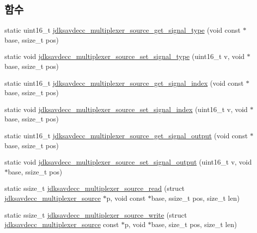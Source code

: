 \subsection*{함수}
\begin{DoxyCompactItemize}
\item 
static uint16\+\_\+t \hyperlink{group__multiplexer__source_ga0707dc4cad979ccf1dbba1a21d3b6348}{jdksavdecc\+\_\+multiplexer\+\_\+source\+\_\+get\+\_\+signal\+\_\+type} (void const $\ast$base, ssize\+\_\+t pos)
\item 
static void \hyperlink{group__multiplexer__source_ga0cbe326f2c6c3e29f647aaf3868d8b0c}{jdksavdecc\+\_\+multiplexer\+\_\+source\+\_\+set\+\_\+signal\+\_\+type} (uint16\+\_\+t v, void $\ast$base, ssize\+\_\+t pos)
\item 
static uint16\+\_\+t \hyperlink{group__multiplexer__source_ga5d365853a896d4d6b9e0c164deb9d268}{jdksavdecc\+\_\+multiplexer\+\_\+source\+\_\+get\+\_\+signal\+\_\+index} (void const $\ast$base, ssize\+\_\+t pos)
\item 
static void \hyperlink{group__multiplexer__source_ga7e54221b3864ffdd04e72ed73ea78c8f}{jdksavdecc\+\_\+multiplexer\+\_\+source\+\_\+set\+\_\+signal\+\_\+index} (uint16\+\_\+t v, void $\ast$base, ssize\+\_\+t pos)
\item 
static uint16\+\_\+t \hyperlink{group__multiplexer__source_gaf4061c043679b0665f21b91e2cf8317d}{jdksavdecc\+\_\+multiplexer\+\_\+source\+\_\+get\+\_\+signal\+\_\+output} (void const $\ast$base, ssize\+\_\+t pos)
\item 
static void \hyperlink{group__multiplexer__source_ga9c0e831523be777a35e3da2f43116902}{jdksavdecc\+\_\+multiplexer\+\_\+source\+\_\+set\+\_\+signal\+\_\+output} (uint16\+\_\+t v, void $\ast$base, ssize\+\_\+t pos)
\item 
static ssize\+\_\+t \hyperlink{group__multiplexer__source_gaf6d689fbacc90c7b72b5b4ab5c118a7c}{jdksavdecc\+\_\+multiplexer\+\_\+source\+\_\+read} (struct \hyperlink{structjdksavdecc__multiplexer__source}{jdksavdecc\+\_\+multiplexer\+\_\+source} $\ast$p, void const $\ast$base, ssize\+\_\+t pos, size\+\_\+t len)
\item 
static ssize\+\_\+t \hyperlink{group__multiplexer__source_ga9e83ef59523c1ab575033e280aa65385}{jdksavdecc\+\_\+multiplexer\+\_\+source\+\_\+write} (struct \hyperlink{structjdksavdecc__multiplexer__source}{jdksavdecc\+\_\+multiplexer\+\_\+source} const $\ast$p, void $\ast$base, size\+\_\+t pos, size\+\_\+t len)
\end{DoxyCompactItemize}


